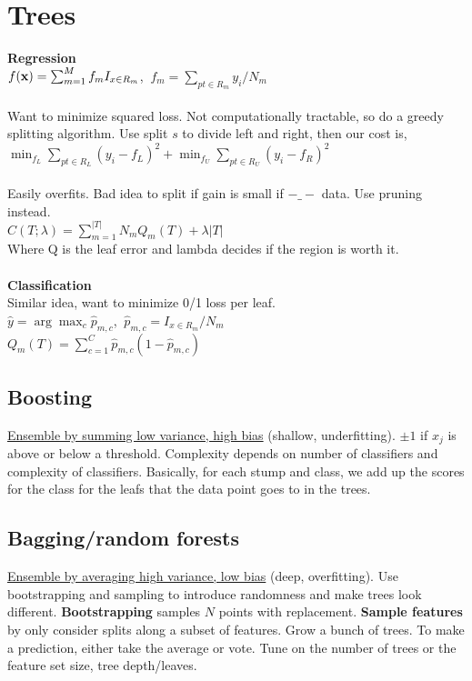 \section{Trees}
\textbf{Regression}\\
$f({\textrm{\textbf{x}}}) = \sum_{m=1}^{M}f_m I_{x\in R_m}$, $~f_m = \sum_{pt\in R_m}y_i / N_m$\\\\
Want to minimize squared loss. 
Not computationally tractable, so do a greedy splitting algorithm. Use split $s$ to divide left and right, then our cost is,\\
$\min_{f_L} \sum_{pt \in R_L}(y_i - f_L)^2 + \min_{f_U}\sum_{pt \in R_U}(y_i - f_R)^2$\\\\
Easily overfits. Bad idea to split if gain is small if $-\_-$ data. Use pruning instead.\\
$C(T; \lambda) = \sum_{m=1}^{|T|}N_m Q_m(T) + \lambda|T|$\\
Where Q is the leaf error and lambda decides if the region is worth it.\\\\
\textbf{Classification}\\
Similar idea, want to minimize 0/1 loss per leaf.\\
$\hat{y} = \arg\max_c \hat{p}_{m,c}$, $~\hat{p}_{m,c} = I_{x\in R_m}/N_m$\\
$Q_m(T) = \sum_{c=1}^{C}\hat{p}_{m,c}(1-\hat{p}_{m,c})$
\subsection{Boosting}
\underline{Ensemble by summing low variance, high bias} (shallow, underfitting). $\pm1$ if $x_j$ is above or below a threshold. Complexity depends on number of classifiers and complexity of classifiers. Basically, for each stump and class, we add up the scores for the class for the leafs that the data point goes to in the trees.
\subsection{Bagging/random forests}
\underline{Ensemble by averaging high variance, low bias} (deep, overfitting). Use bootstrapping and sampling to introduce randomness and make trees look different. \textbf{Bootstrapping} samples $N$ points with replacement. \textbf{Sample features} by only consider splits along a subset of features. Grow a bunch of trees. To make a prediction, either take the average or vote. Tune on the number of trees or the feature set size, tree depth/leaves.